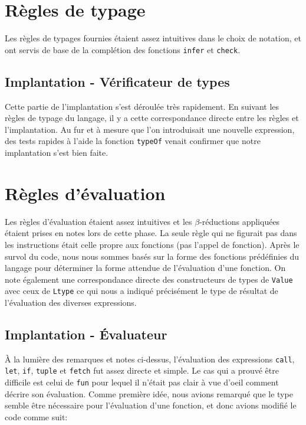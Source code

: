 \documentclass[11pt, titlepage]{article}
\begin{document}
\section{Règles de typage}

Les règles de typages fournies étaient assez intuitives dans le choix de
notation, et ont servis de base de la complétion des fonctions \texttt{infer}
et \texttt{check}.

\subsection{Implantation - Vérificateur de types}

Cette partie de l'implantation s'est déroulée très rapidement. En suivant les
règles de typage du langage, il y a cette correspondance directe entre les
règles et l'implantation. Au fur et à mesure que l'on introduisait une nouvelle
expression, des tests rapides à l'aide la fonction \texttt{typeOf} venait
confirmer que notre implantation s'est bien faite.

\section{Règles d'évaluation}

Les règles d'évaluation étaient assez intuitives et les \(\beta\)-réductions
appliquées étaient prises en notes lors de cette phase. La seule règle qui ne
figurait pas dans les instructions était celle propre aux fonctions (pas
l'appel de fonction). Après le survol du code, nous nous sommes basés sur la
forme des fonctions prédéfinies du langage pour déterminer la forme attendue de
l'évaluation d'une fonction. On note également une correspondance directe des
constructeurs de types de \texttt{Value} avec ceux de \texttt{Ltype} ce qui
nous a indiqué précisément le type de résultat de l'évaluation des diverses
expressions.

\subsection{Implantation - Évaluateur}

À la lumière des remarques et notes ci-dessus, l'évaluation des expressions
\texttt{call}, \texttt{let}, \texttt{if}, \texttt{tuple} et \texttt{fetch}
fut assez directe et simple. Le cas qui a prouvé être difficile est celui de
\texttt{fun} pour lequel il n'était pas clair à vue d'oeil comment décrire son
évaluation. Comme première idée, nous avions remarqué que le type semble être
nécessaire pour l'évaluation d'une fonction, et donc avions modifié le code
comme suit:
\end{document}
